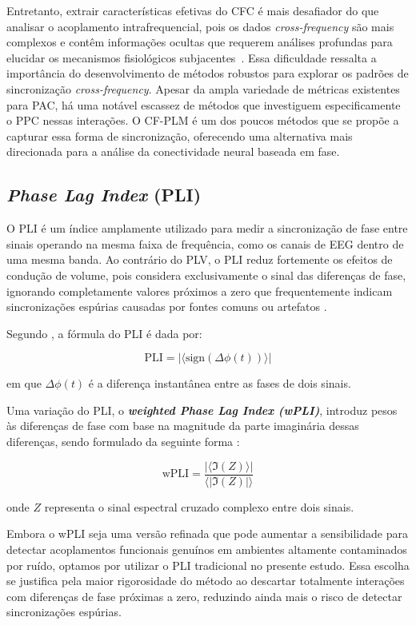 Entretanto, extrair características efetivas do CFC é mais desafiador do que analisar o acoplamento intrafrequencial, pois os dados \textit{cross-frequency} são mais complexos e contêm informações ocultas que requerem análises profundas para elucidar os mecanismos fisiológicos subjacentes~\cite{ren2022multi}. Essa dificuldade ressalta a importância do desenvolvimento de métodos robustos para explorar os padrões de sincronização \textit{cross-frequency}. Apesar da ampla variedade de métricas existentes para PAC, há uma notável escassez de métodos que investiguem especificamente o PPC nessas interações. O CF-PLM é um dos poucos métodos que se propõe a capturar essa forma de sincronização, oferecendo uma alternativa mais direcionada para a análise da conectividade neural baseada em fase.

\subsection{\textit{Phase Lag Index} (PLI)}
O PLI é um índice amplamente utilizado para medir a sincronização de fase entre sinais operando na mesma faixa de frequência, como os canais de EEG dentro de uma mesma banda. Ao contrário do PLV, o PLI reduz fortemente os efeitos de condução de volume, pois considera exclusivamente o sinal das diferenças de fase, ignorando completamente valores próximos a zero que frequentemente indicam sincronizações espúrias causadas por fontes comuns ou artefatos \cite{seraj2018cerebral}.

Segundo , a fórmula do PLI é dada por:

\[
\text{PLI} = |\langle \text{sign}(\Delta\phi(t)) \rangle|
\]

em que \(\Delta\phi(t)\) é a diferença instantânea entre as fases de dois sinais.

Uma variação do PLI, o \textit{\textbf{weighted Phase Lag Index (wPLI)}}, introduz pesos às diferenças de fase com base na magnitude da parte imaginária dessas diferenças, sendo formulado da seguinte forma \cite{seraj2018cerebral}:

\[
\text{wPLI} = \frac{|\langle \Im(Z) \rangle|}{\langle |\Im(Z)| \rangle}
\]

onde \(Z\) representa o sinal espectral cruzado complexo entre dois sinais.

Embora o wPLI seja uma versão refinada que pode aumentar a sensibilidade para detectar acoplamentos funcionais genuínos em ambientes altamente contaminados por ruído, optamos por utilizar o PLI tradicional no presente estudo. Essa escolha se justifica pela maior rigorosidade do método ao descartar totalmente interações com diferenças de fase próximas a zero, reduzindo ainda mais o risco de detectar sincronizações espúrias.


